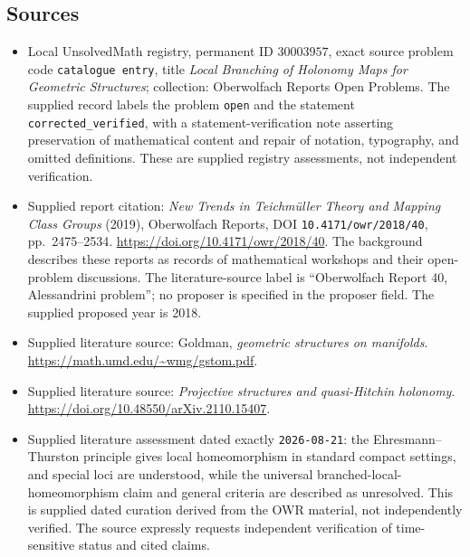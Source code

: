 \documentclass[11pt]{article}
\begin{document}
\subsection{Sources}
\begin{itemize}
\item Local UnsolvedMath registry, permanent ID \(30003957\), exact source problem code \texttt{catalogue entry}, title \emph{Local Branching of Holonomy Maps for Geometric Structures}; collection: Oberwolfach Reports Open Problems. The supplied record labels the problem \texttt{open} and the statement \texttt{corrected\_verified}, with a statement-verification note asserting preservation of mathematical content and repair of notation, typography, and omitted definitions. These are supplied registry assessments, not independent verification.
\item Supplied report citation: \emph{New Trends in Teichmüller Theory and Mapping Class Groups} (2019), Oberwolfach Reports, DOI \texttt{10.4171/owr/2018/40}, pp.\ 2475--2534. \url{https://doi.org/10.4171/owr/2018/40}. The background describes these reports as records of mathematical workshops and their open-problem discussions. The literature-source label is ``Oberwolfach Report 40, Alessandrini problem''; no proposer is specified in the proposer field. The supplied proposed year is 2018.
\item Supplied literature source: Goldman, \emph{geometric structures on manifolds}. \url{https://math.umd.edu/~wmg/gstom.pdf}.
\item Supplied literature source: \emph{Projective structures and quasi-Hitchin holonomy}. \url{https://doi.org/10.48550/arXiv.2110.15407}.
\item Supplied literature assessment dated exactly \texttt{2026-08-21}: the Ehresmann--Thurston principle gives local homeomorphism in standard compact settings, and special loci are understood, while the universal branched-local-homeomorphism claim and general criteria are described as unresolved. This is supplied dated curation derived from the OWR material, not independently verified. The source expressly requests independent verification of time-sensitive status and cited claims.
\end{itemize}
\end{document}
